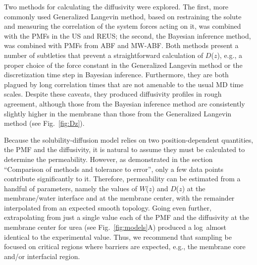 Two methods for calculating the diffusivity were explored.  The first, more commonly used Generalized Langevin method, based on restraining the solute and measuring the correlation of the system forces acting on it, was combined with the PMFs in the US and REUS; the second, the Bayesian inference method, was combined with PMFs from ABF and MW-ABF.  Both methods present a number of subtleties that prevent a straightforward calculation of $D$($z$), e.g., a proper choice of the force constant in the Generalized Langevin method or the discretization time step in Bayesian inference.  Furthermore, they are both plagued by long correlation times that are not amenable to the usual MD time scales.  Despite these caveats, they produced diffusivity profiles in rough agreement, although those from the Bayesian inference method are consistently slightly higher in the membrane than those from the Generalized Langevin method (see Fig.~\ref{fig:Dz}).  

Because the solubility-diffusion model relies on two position-dependent quantities, the PMF and the diffusivity, it is natural to assume they must be calculated to determine the permeability.  However, as demonstrated in the section ``Comparison of methods and tolerance to error'', only a few data points contribute significantly to it.  Therefore, permeability can be estimated from a handful of parameters, namely the values of $W$($z$) and $D$($z$) at the membrane/water interface and at the membrane center, with the remainder interpolated from an expected smooth topology.  Going even further, extrapolating from just a single value each of the PMF and the diffusivity at the membrane center for urea (see Fig.~\ref{fig:models}A) produced a log\perm~almost identical to the experimental value.  Thus, we recommend that sampling be focused on critical regions where barriers are expected, e.g., the membrane core and/or interfacial region.

